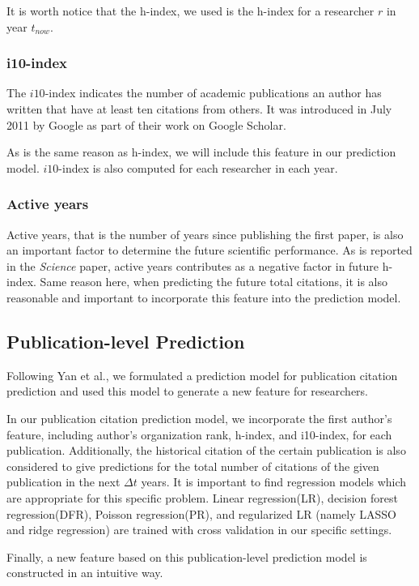 It is worth notice that the h-index, we used is the h-index for a researcher $r$ in year $t_{now}$.

\subsubsection{i10-index}
The $i10$-index indicates the number of academic publications an author has written that have at least ten citations from others.
It was introduced in July 2011 by Google as part of their work on Google Scholar.\cite{delgado2014google}

As is the same reason as h-index, we will include this feature in our prediction model. $i10$-index is also computed for each researcher in each year.

\subsubsection{Active years}
Active years, that is the number of years since publishing the first paper, is also an important factor to determine the future scientific performance.
As is reported in the {\it Science} paper\cite{acuna2012future}, active years contributes as a negative factor in future h-index.
Same reason here, when predicting the future total citations, it is also reasonable and important to incorporate this feature into the prediction model.

\subsection{Publication-level Prediction}
Following Yan et al.\cite{yan2011citation}, we formulated a prediction model for publication citation prediction and used this model to generate a new feature for researchers.

In our publication citation prediction model, we incorporate the first author's feature, including author's organization rank, h-index, and i10-index, for each publication.
Additionally, the historical citation of the certain publication is also considered to give predictions for the total number of citations of the given publication in the next $\Delta t$ years.
It is important to find regression models which are appropriate for this specific problem.
Linear regression(LR), decision forest regression(DFR), Poisson regression(PR), and regularized LR (namely LASSO and ridge regression) are trained with cross validation in our specific settings.

Finally, a new feature based on this publication-level prediction model is constructed in an intuitive way.

